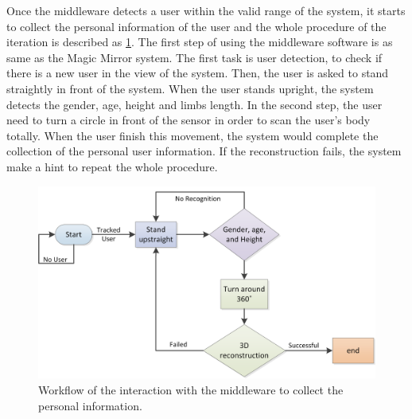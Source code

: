 Once the middleware detects a user within the valid range of the system, it starts to collect the personal information of the user and the whole procedure of the iteration is described as \figurename{\ref{fig:3-PRMM:InteractionWithMiddleware}}.
The first step of using the middleware software is as same as the Magic Mirror system. The first task is user detection, to check if there is a new user in the view of the system. Then, the user is asked to stand straightly in front of the system. When the user stands upright, the system detects the gender, age, height and limbs length. 
In the second step, the user need to turn a circle in front of the sensor in order to scan the user's body totally. When the user finish this movement, the system would complete the collection of the personal user information. If the reconstruction fails, the system make a hint to repeat the whole procedure.
\begin{figure}
	\centering
	\includegraphics[width=0.75\linewidth]{figures/3-PRMM/InteractionWithMiddleware.png}
	\caption{Workflow of the interaction with the middleware to collect the personal information.}
	\label{fig:3-PRMM:InteractionWithMiddleware}
\end{figure}

